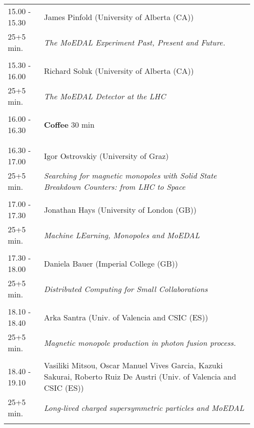 \begin{longtable}{p{3cm}p{13cm}}
15.00 - 15.30 & James Pinfold (University of Alberta (CA))\\ 
25+5 min. & {\it The MoEDAL Experiment Past, Present and Future.}\\ 
 & \\ 
15.30 - 16.00 & Richard Soluk (University of Alberta (CA))\\ 
25+5 min. & {\it The MoEDAL Detector at the LHC}\\ 
 & \\ 
16.00 - 16.30 & {\bf Coffee} \hfill 30 min \\ 
 & \\ 
 & \\ 
16.30 - 17.00 & Igor Ostrovskiy (University of Graz)\\ 
25+5 min. & {\it Searching for magnetic monopoles with Solid State Breakdown Counters: from LHC to Space}\\ 
 & \\ 
17.00 - 17.30 & Jonathan Hays (University of London (GB))\\ 
25+5 min. & {\it Machine LEarning, Monopoles and MoEDAL}\\ 
 & \\ 
17.30 - 18.00 & Daniela Bauer (Imperial College (GB))\\ 
25+5 min. & {\it Distributed Computing for Small Collaborations}\\ 
 & \\ 
18.10 - 18.40 & Arka Santra (Univ. of Valencia and CSIC (ES))\\ 
25+5 min. & {\it Magnetic monopole production in photon fusion process.}\\ 
 & \\ 
18.40 - 19.10 & Vasiliki Mitsou, Oscar Manuel Vives Garcia, Kazuki Sakurai, Roberto Ruiz De Austri (Univ. of Valencia and CSIC (ES))\\ 
25+5 min. & {\it Long-lived charged supersymmetric particles and MoEDAL}\\ 
 & \\ 
\end{longtable}

